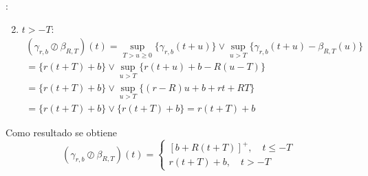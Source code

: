 \documentclass[xcolor={x11names}]{beamer}
\begin{document}
\begin{frame}{\secname: \subsecname}
    \begin{enumerate}
        \setcounter{enumi}{1}
        \item $t>-T$:
        \begin{multline*}
        (\gamma_{r,b}
        \oslash
        \beta_{R,T})(t)
        =\sup_{T>u \geq0}
        \{
        \gamma_{r,b}(t+u)
        \}
        \lor
        \sup_{u>T}
        \{
        \gamma_{r,b}(t+u)
        -
        \beta_{R,T}(u)
        \}\\
        =\{ r(t+T)+b \}
        \lor
        \sup_{u>T}\{
            r(t+u)+b
            -R(u-T)
        \}\\
        =\{ r(t+T)+b \}
        \lor
        \sup_{u>T}\{
            (r-R)u+b
            +rt+RT
        \}\\
        =\{ r(t+T)+b \}
        \lor
        \{
            r(t+T)+b
        \}
        =r(t+T)+b
        \end{multline*}
    \end{enumerate}

    \pause
    Como resultado se obtiene
    \begin{equation*}
        (\gamma_{r,b}
        \oslash
        \beta_{R,T})(t)
        =
        \begin{cases}
            [b+R(t+T)]^+,\quad t\leq -T\\
            r(t+T)+b,\quad t>-T
        \end{cases}
    \end{equation*}
\end{frame}
\end{document}
